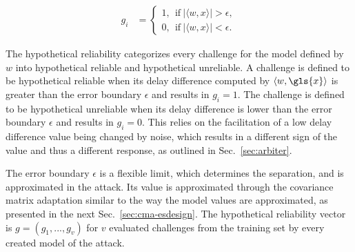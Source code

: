 \begin{equation}
\begin{aligned}
g_i &=
\begin{cases}
1,\ \ \text{if}\ |\langle w, x \rangle| > \epsilon,\\
0,\ \ \text{if}\ |\langle w, x \rangle| < \epsilon. \label{equ:hypotheticalreliability}
\end{cases}
\end{aligned}
\end{equation}

The hypothetical reliability categorizes every challenge for the model defined by $w$ into hypothetical reliable and hypothetical unreliable. %
A challenge is defined to be hypothetical reliable when its delay difference computed by $\langle w, \gls{x} \rangle$ is greater than the error boundary $\epsilon$ and results in $g_i = 1$.
The challenge is defined to be hypothetical unreliable when its delay difference is lower than the error boundary $\epsilon$ and results in $g_i = 0$. %
This relies on the facilitation of a low delay difference value being changed by noise, which results in a different sign of the value and thus a different response, as outlined in Sec.\ \ref{sec:arbiter}. 

The error boundary $\epsilon$ is a flexible limit, which determines the separation, and is approximated in the attack.
Its value is approximated through the covariance matrix adaptation similar to the way the model values are approximated, as presented in the next Sec.\ \ref{sec:cma-esdesign}.
The hypothetical reliability vector is $g = (g_1, ..., g_v)$ for $v$ evaluated challenges from the training set by every created model of the attack.


